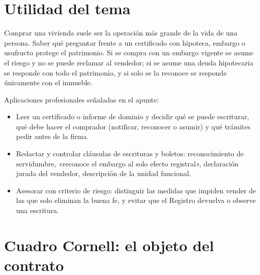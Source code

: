\documentclass[12pt,oneside]{book}
\begin{document}
\section{Utilidad del tema}

Comprar una vivienda suele ser la operación más grande de la vida de una persona. Saber qué preguntar frente a un certificado con hipoteca, embargo o usufructo protege el patrimonio. Si se compra con un embargo vigente se asume el riesgo y no se puede reclamar al vendedor; si se asume una deuda hipotecaria se responde con todo el patrimonio, y si solo se la reconoce se responde únicamente con el inmueble.

Aplicaciones profesionales señaladas en el apunte:
\begin{itemize}
\item Leer un certificado o informe de dominio y decidir qué se puede escriturar, qué debe hacer el comprador (notificar, reconocer o asumir) y qué trámites pedir antes de la firma.
\item Redactar y controlar cláusulas de escrituras y boletos: reconocimiento de servidumbre, «reconoce el embargo al solo efecto registral», declaración jurada del vendedor, descripción de la unidad funcional.
\item Asesorar con criterio de riesgo: distinguir las medidas que impiden vender de las que solo eliminan la buena fe, y evitar que el Registro devuelva o observe una escritura.
\end{itemize}

\section*{Cuadro Cornell: el objeto del contrato}
\end{document}
